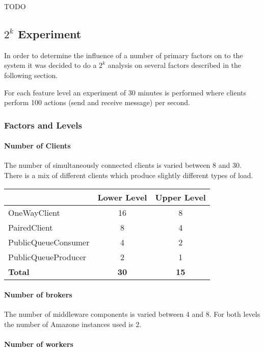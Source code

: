 \documentclass[milestone1.tex]{subfiles}
\begin{document}
TODO

\subsection{$2^k$ Experiment}
In order to determine the influence of a number of primary factors on to the system it was decided to do a $2^k$ analysis on several factors described in the following section.

For each feature level an experiment of 30 minutes is performed where clients perform 100 actions (send and receive message) per second.

\subsubsection{Factors and Levels}

\paragraph{Number of Clients}
The number of simultaneously connected clients is varied between 8 and 30. There is a mix of different clients which produce slightly different types of load.

\begin{tabular}{|l|c|c|}
\hline 
 & Lower Level & Upper Level \\ 
\hline 
OneWayClient & 16 & 8  \\ 
\hline 
PairedClient & 8 & 4 \\ 
\hline 
PublicQueueConsumer & 4 & 2 \\ 
\hline 
PublicQueueProducer & 2 & 1 \\ 
\hline 
\textbf{Total}  & \textbf{30} & \textbf{15} \\
\hline 
\end{tabular} 

\paragraph{Number of brokers}

The number of middleware components is varied between 4 and 8. For both levels the number of Amazone instances used is 2.

\paragraph{Number of workers}
\end{document}

